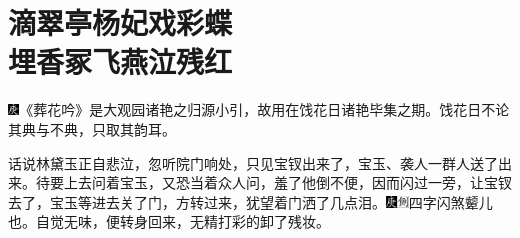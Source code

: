 

\chapter{滴翠亭杨妃戏彩蝶\\埋香冢飞燕泣残红}\label{part0031_split_000.htmlux5cux23calibre_pb_0}

{\includegraphics[width=3mm]{../Images/00004}《葬花吟》是大观园诸艳之归源小引，故用在饯花日诸艳毕集之期。饯花日不论其典与不典，只取其韵耳。}

话说林黛玉正自悲泣，忽听院门响处，只见宝钗出来了，宝玉、袭人一群人送了出来。待要上去问着宝玉，又恐当着众人问，羞了他倒不便，因而闪过一旁，让宝钗去了，宝玉等进去关了门，方转过来，犹望着门洒了几点泪。{\includegraphics[width=3mm]{../Images/00004}\includegraphics[width=3mm]{../Images/00011}\footnotesize \kaishu 四字闪煞颦儿也。}自觉无味，便转身回来，无精打彩的卸了残妆。

